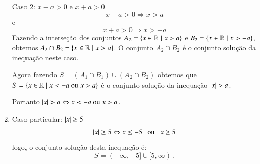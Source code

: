 \begin{exem}
\begin{enumerate}
   Caso 2: $x-a> 0$ e $x+a> 0$
   \[x-a> 0 \Rightarrow x> a\]
   e
   \[x+a> 0 \Rightarrow x> -a \]
   Fazendo a interseção dos conjuntos $A_2= \left\{ x \in \mathbb{R} \mid x> a \right\}$ e $B_2= \left\{ x \in \mathbb{R} \mid x> -a \right\}$, obtemos $A_2 \cap B_2= \left\{ x \in \mathbb{R} \mid x> a \right\}$. O conjunto $A_2 \cap B_2$ é o conjunto solução da inequação neste caso.

   Agora fazendo $S= (A_1 \cap B_1) \cup (A_2 \cap B_2)$ obtemos que $S= \left\{ x \in \mathbb{R} \mid x<-a \text{ ou } x> a \right\}$ é o conjunto solução da inequação $\left|x\right| > a$.

  Portanto $\left|x\right| > a \Leftrightarrow x<-a \text{ ou } x> a$.

   \item Caso particular: $\left|x\right| \geq 5$
   \[\left|x\right| \geq 5 \Leftrightarrow x \leq -5 \ \ \text{ ou } \ \ x \geq 5\]
   logo, o conjunto solução desta inequação é:
   \[S= (-\infty, -5] \cup [5, \infty) \ . \]

  \end{enumerate}

 \end{exem}



